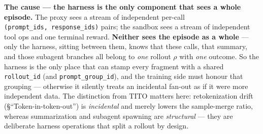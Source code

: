 \documentclass[
  paper=a4,
  ,captions=tableheading
]{scrartcl}
\begin{document}
\textbf{The cause --- the harness is the only component that sees a
whole episode.} The proxy sees a stream of independent per-call
\texttt{(prompt\_ids,\ response\_ids)} pairs; the sandbox sees a stream
of independent tool ops and one terminal reward. \textbf{Neither sees
the episode as a whole} --- only the harness, sitting between them,
knows that these calls, that summary, and those subagent branches all
belong to \emph{one} rollout \(\rho\) with \emph{one} outcome. So the
harness is the only place that can stamp every fragment with a shared
\texttt{rollout\_id} (and \texttt{prompt\_group\_id}), and the training
side must honour that grouping --- otherwise it silently treats an
incidental fan-out as if it were more independent data. The distinction
from TITO matters here: retokenization drift (§``Token-in-token-out'')
is \emph{incidental} and merely lowers the sample-merge ratio, whereas
summarization and subagent spawning are \emph{structural} --- they are
deliberate harness operations that split a rollout by design.
\end{document}
